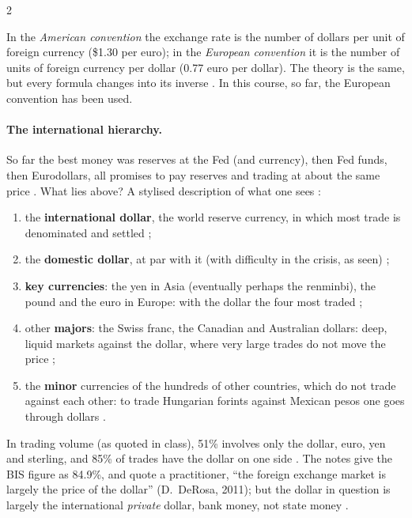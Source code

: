 \begin{paracol}{2}
\begin{definition}
In the \emph{American convention} the exchange rate is the number of dollars per unit of foreign currency (\$1.30 per euro); in the \emph{European convention}
it is the number of units of foreign currency per dollar (0.77 euro per dollar). The theory is the same, but every formula changes into its inverse
. In this course, so far, the European convention has been used.
\end{definition}

\paragraph{The international hierarchy.} So far the best money was reserves at the Fed (and currency), then Fed funds, then Eurodollars, all promises to pay
reserves and trading at about the same price . What lies above? A stylised description of what one sees
:
\begin{enumerate}
  \item the \textbf{international dollar}, the world reserve currency, in which most trade is denominated and settled ;
  \item the \textbf{domestic dollar}, at par with it (with difficulty in the crisis, as seen) ;
  \item \textbf{key currencies}: the yen in Asia (eventually perhaps the renminbi), the pound and the euro in Europe: with the dollar the four most traded
        ;
  \item other \textbf{majors}: the Swiss franc, the Canadian and Australian dollars: deep, liquid markets against the dollar, where very large trades do not move
        the price ;
  \item the \textbf{minor} currencies of the hundreds of other countries, which do not trade against each other: to trade Hungarian forints against Mexican pesos
        one goes through dollars .
\end{enumerate}
In trading volume (as quoted in class), 51\% involves only the dollar, euro, yen and sterling, and 85\% of trades have the dollar on one side .
The notes give the BIS figure as 84.9\%, and quote a practitioner, ``the foreign exchange market is largely the price of the dollar'' (D.~DeRosa, 2011); but the dollar in question is
largely the international \emph{private} dollar, bank money, not state money .


\end{paracol}
